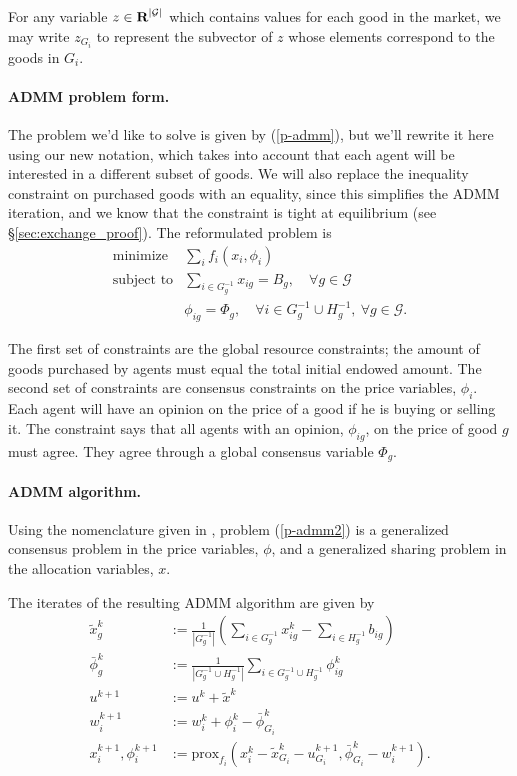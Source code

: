 \documentclass[12pt]{article}
\begin{document}
For any variable $z \in {\mbox{\bf R}}^{|\mathcal{G}|}$ which contains values for
each good in the market, we may write $z_{G_i}$ to represent the subvector
of $z$ whose elements correspond to the goods in $G_i$.

\paragraph{ADMM problem form.}

The problem we'd like to solve is given by (\ref{p-admm}), but we'll rewrite it
here using our new notation, which takes into account that each agent will be
interested in a different subset of goods. We will also replace the inequality
constraint on purchased goods with an equality, since this simplifies the ADMM
iteration, and we know that the constraint is tight at equilibrium (see
\S\ref{sec:exchange_proof}).
The reformulated problem is
\begin{equation}
\begin{array}{ll}
\mbox{minimize} & \sum_i f_i(x_i, \phi_i) \\
\mbox{subject to} & \sum\limits_{i \in G^{-1}_g} x_{ig} = B_g,\quad \forall g \in \mathcal{G}\\
& \phi_{ig} = \Phi_g,\quad \forall i \in G^{-1}_g \cup H^{-1}_g,\ \forall g \in \mathcal{G}.
\end{array}
\label{p-admm2}
\end{equation}

The first set of constraints are the global resource constraints; the amount of
goods purchased by agents must equal the total initial endowed amount. The
second set of constraints are consensus constraints on the price variables,
$\phi_i$. Each agent will have an opinion on the price of a good if he is
buying or selling it. The constraint says that all agents with an opinion,
$\phi_{ig}$, on the price of good $g$ must agree. They agree through a global
consensus variable $\Phi_g$.


\paragraph{ADMM algorithm.}

Using the nomenclature given in \cite{boyd2011distributed}, problem
(\ref{p-admm2}) is a generalized consensus problem in the price variables,
$\phi$, and a generalized sharing problem in the allocation variables, $x$.

The iterates of the resulting ADMM algorithm are given by
\begin{align}
\label{a-xtild}
\tilde{x}^k_g &:= \frac{1}{|G^{-1}_g|} \left( \sum_{i \in G^{-1}_g} x^k_{ig} - \sum_{i \in H^{-1}_g} b_{ig}\right)\\
\label{a-phibar}
\bar{\phi}^k_g &:= \frac{1}{ |G^{-1}_g \cup H^{-1}_g| } \sum_{i \in G^{-1}_g \cup H^{-1}_g}\phi^k_{ig}\\
u^{k+1} &:= u^k + \tilde{x}^k\\
w_i^{k+1} &:= w_i^k + \phi^k_i - \bar{\phi}^k_{G_i}\\
\label{a-prox}
x_i^{k+1}, \phi_i^{k+1} &:= \mbox{prox}_{f_i}(x_i^k - \tilde{x}^k_{G_i} - u^{k+1}_{G_i},
\bar{\phi}^k_{G_i} - w_i^{k+1}).
\end{align}
\end{document}
